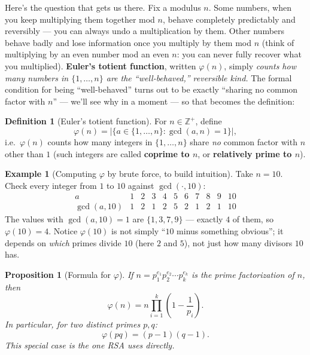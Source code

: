 \documentclass[11pt]{article}
\newtheorem{proposition}[theorem]{Proposition}
\theoremstyle{definition}
\newtheorem{definition}[theorem]{Definition}
\newtheorem{example}[theorem]{Example}
\theoremstyle{remark}
\begin{document}
Here's the question that gets us there. Fix a modulus $n$. Some numbers, when you keep multiplying them together mod $n$, behave completely predictably and reversibly — you can always undo a multiplication by them. Other numbers behave badly and lose information once you multiply by them mod $n$ (think of multiplying by an even number mod an even $n$: you can never fully recover what you multiplied). \textbf{Euler's totient function}, written $\varphi(n)$, simply \emph{counts how many numbers in $\{1,\dots,n\}$ are the ``well-behaved,'' reversible kind.} The formal condition for being ``well-behaved'' turns out to be exactly ``sharing no common factor with $n$'' — we'll see why in a moment — so that becomes the definition:

\begin{definition}[Euler's totient function]
For $n \in \mathbb{Z}^{+}$, define
\[
\varphi(n) = |\{a \in \{1, \dots, n\} : \gcd(a,n) = 1\}|,
\]
i.e.\ $\varphi(n)$ counts how many integers in $\{1,\dots,n\}$ share \emph{no} common factor with $n$ other than $1$ (such integers are called \textbf{coprime to $n$}, or \textbf{relatively prime to $n$}).
\end{definition}

\begin{example}[Computing $\varphi$ by brute force, to build intuition]
Take $n=10$. Check every integer from $1$ to $10$ against $\gcd(\cdot,10)$:
\[
\begin{array}{c|cccccccccc}
a & 1 & 2 & 3 & 4 & 5 & 6 & 7 & 8 & 9 & 10\\
\hline
\gcd(a,10) & 1 & 2 & 1 & 2 & 5 & 2 & 1 & 2 & 1 & 10
\end{array}
\]
The values with $\gcd(a,10)=1$ are $\{1,3,7,9\}$ — exactly $4$ of them, so $\varphi(10)=4$. Notice $\varphi(10)$ is not simply ``$10$ minus something obvious''; it depends on \emph{which} primes divide $10$ (here $2$ and $5$), not just how many divisors $10$ has.
\end{example}



\begin{proposition}[Formula for $\varphi$]\label{prop:totient}
If $n = p_1^{e_1} p_2^{e_2} \cdots p_k^{e_k}$ is the prime factorization of $n$, then
\[
\varphi(n) = n \prod_{i=1}^{k}\left(1 - \frac{1}{p_i}\right).
\]
In particular, for two \emph{distinct} primes $p, q$:
\[
\varphi(pq) = (p-1)(q-1).
\]
This special case is the one RSA uses directly.
\end{proposition}
\end{document}
